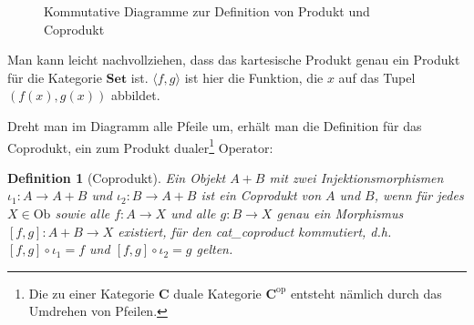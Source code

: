 \documentclass[a4paper, bibgerm]{article}
\newcommand\abb{}
\newcommand\ato{\rightarrow}
\newtheorem{defini}{Definition}
\newcommand{\defi}[2]{%
  \begin{defini}[#1]
    \label{def:#1}
    #2
  \end{defini}
}
\begin{document}
\begin{figure}
  \centering
  \caption{Kommutative Diagramme zur Definition von Produkt und Coprodukt}
\end{figure}

Man kann leicht nachvollziehen, dass das kartesische Produkt genau ein
Produkt für die Kategorie $\mathbf{Set}$ ist. $\langle f,g \rangle$ ist
hier die Funktion, die $x$ auf das Tupel $(f(x), g(x))$ abbildet.

Dreht man im Diagramm alle Pfeile um, erhält man die Definition für das
Coprodukt, ein zum Produkt dualer\footnote{Die zu einer Kategorie
  $\mathbf{C}$ duale Kategorie $\mathbf{C}^{\mathrm{op}}$ entsteht
  nämlich durch das Umdrehen von Pfeilen.} Operator:

\defi{Coprodukt}{ Ein Objekt $A + B$ mit zwei Injektionsmorphismen
  $\iota_1 : A \ato A + B$ und $\iota_2 : B \ato A + B$ ist ein
  Coprodukt von $A$ und $B$, wenn für jedes $X \in \mathrm{Ob}$ sowie
  alle $f : A \ato X$ und alle $g : B \ato X$ genau ein Morphismus
  $[f,g] : A + B \ato X$ existiert, für den \abb{cat_coproduct}
  kommutiert, d.h.  $[f,g] \circ \iota_1 = f$ und $[f,g] \circ \iota_2 =
  g$ gelten.  }
\end{document}
